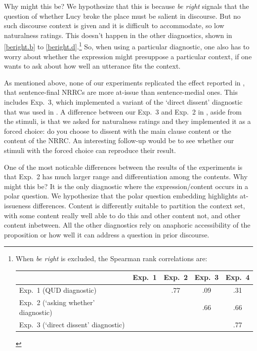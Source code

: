 \documentclass[times,linguex,xcolor]{glossa}
\begin{document}
  Why might this be? We hypothesize that this is because \emph{be right} signals that the question of whether Lucy broke the place must be salient in discourse. But no such discourse context is given and it is difficult to accommodate, so low naturalness ratings. This doesn't happen in the other diagnostics, shown in \ref{beright.b} to \ref{beright.d}.\footnote{When \emph{be right} is excluded, the Spearman rank correlations are:
    
   \begin{tabular}{l | c c c c}
   & Exp.~1 & Exp.~2 & Exp.~3 & Exp.~4 \\ \hline
   Exp.~1 (QUD diagnostic) & \cellcolor{lightgray} & .77 & .09 & .31 \\
   Exp.~2 (`asking whether' diagnostic) & \cellcolor{lightgray} & \cellcolor{lightgray} & .66 & .66 \\
   Exp.~3 (`direct dissent' diagnostic) & \cellcolor{lightgray}& \cellcolor{lightgray} & \cellcolor{lightgray} & .77  \\
   \hline
   \end{tabular}} So, when using a particular diagnostic, one also has to worry about whether the expression might presuppose a particular context, if one wants to ask about how well an utterance fits the context.
   
   As mentioned above, none of our experiments replicated the effect reported in \citealt{syrett_experimental_2015}, that sentence-final NRRCs are more at-issue than sentence-medial ones. This includes Exp.~3, which implemented a variant of the `direct dissent' diagnostic that was used in \citealt{syrett_experimental_2015}. A difference between our Exp.~3 and Exp.~2 in \citealt{syrett_experimental_2015}, aside from the stimuli, is that we asked for naturalness ratings and they implemented it as a forced choice: do you choose to dissent with the main clause content or the content of the NRRC. An interesting follow-up would be to see whether our stimuli with the forced choice can reproduce their result.
   
   One of the most noticable differences between the results of the experiments is that Exp.~2 has much larger range and differentiation among the contents. Why might this be? It is the only diagnostic where the expression/content occurs in a polar question. We hypothesize that the polar question embedding highlights at-issueness differences. Content is differently suitable to partition the context set, with some content really well able to do this and other content not, and other content inbetween. All the other diagnostics rely on anaphoric accessibility of the proposition or how well it can address a question in prior discourse. 
   
\end{document}
